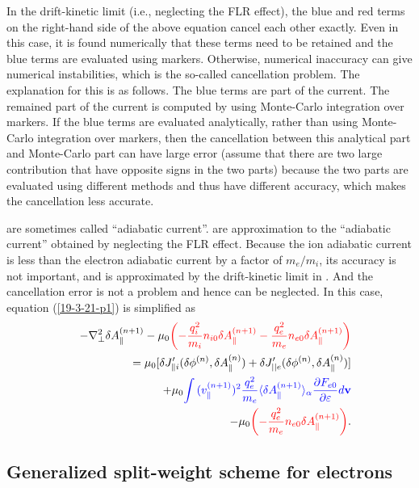 \documentclass{llncs}
\newcommand{\tmcolor}[2]{{\color{#1}{#2}}}
\begin{document}
In the drift-kinetic limit (i.e., neglecting the FLR effect), the blue and red
terms on the right-hand side of the above equation cancel each other exactly.
Even in this case, it is found numerically that these terms need to be
retained and the blue terms are evaluated using markers. Otherwise, numerical
inaccuracy can give numerical instabilities, which is the so-called
cancellation problem. The explanation for this is as follows. The blue terms
are part of the current. The remained part of the current is computed by using
Monte-Carlo integration over markers. If the blue terms are evaluated
analytically, rather than using Monte-Carlo integration over markers, then the
cancellation between this analytical part and Monte-Carlo part can have large
error (assume that there are two large contribution that have opposite signs
in the two parts) because the two parts are evaluated using different methods
and thus have different accuracy, which makes the cancellation less accurate.

\tmcolor{blue}{The blue terms} are sometimes called ``adiabatic current''.
\tmcolor{red}{The red terms} are approximation to the ``adiabatic current''
obtained by neglecting the FLR effect. Because the ion adiabatic current is
less than the electron adiabatic current by a factor of $m_e / m_i$, its
accuracy is not important, and is approximated by the drift-kinetic limit in
{}. And the cancellation error is not a problem and hence can be
neglected. In this case, equation (\ref{19-3-21-p1}) is simplified as
\begin{eqnarray}
  &  & - \nabla^2_{\perp} \delta A_{\parallel}^{(n + 1)} - \mu_0
  \tmcolor{red}{\left( - \frac{q^2_i}{m_i} n_{i 0} \delta A_{\parallel}^{(n +
  1)} - \frac{q^2_e}{m_e} n_{e 0} \delta A_{\parallel}^{(n + 1)} \right)}
  \nonumber\\
  &  & = \mu_0 [\delta J_{\parallel i}' (\delta \phi^{(n)}, \delta
  A_{\parallel}^{(n)}) + \delta J'_{||e} (\delta \phi^{(n)}, \delta
  A_{\parallel}^{(n)})] \nonumber\\
  &  & + \mu_0 \tmcolor{blue}{\int {(v_{\parallel}^{(n + 1)})^2} 
  \frac{q^2_e}{m_e} \langle \delta A_{\parallel}^{(n + 1)} \rangle_{\alpha}
  \frac{\partial F_{e 0}}{\partial \varepsilon} d\mathbf{v}} \nonumber\\
  &  & - \mu_0 \tmcolor{red}{\left( - \frac{q^2_e}{m_e} n_{e 0} \delta
  A_{\parallel}^{(n + 1)} \right)} .  \label{19-3-25-p1}
\end{eqnarray}


\subsection{Generalized split-weight scheme for electrons}
\end{document}
